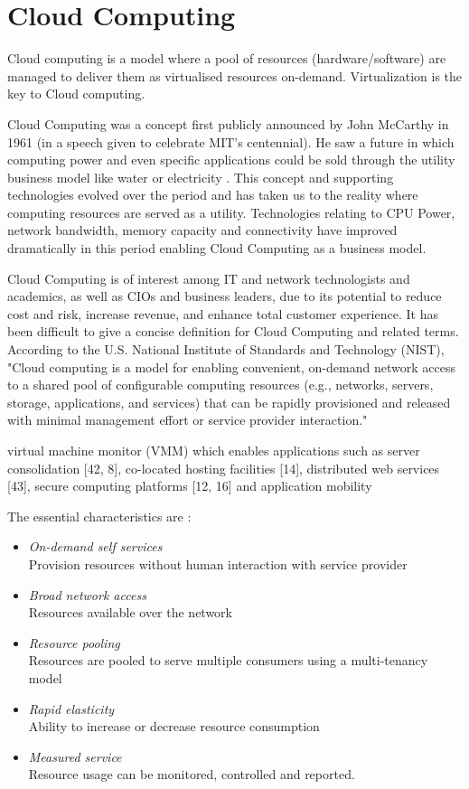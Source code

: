 \documentclass[12pt,a4paper]{report}
\begin{document}
\section{Cloud Computing}

Cloud computing is a model where a pool of resources (hardware/software) are
managed to deliver them as virtualised resources on-demand. Virtualization is the key
to Cloud computing.


Cloud Computing was a concept first publicly announced by John McCarthy in 1961 
(in a speech given to celebrate MIT's centennial). He saw a future in which computing 
power and even specific applications could be sold through the utility 
business model like water or electricity \cite{garfinkel1999architects}.
This concept and  supporting technologies evolved over the period and has taken us 
to the reality where computing resources are served as a utility. 
Technologies relating to CPU Power, network bandwidth, memory capacity 
and connectivity have improved dramatically in this period enabling Cloud Computing as 
a business model.

Cloud Computing is of interest among IT and network technologists
and academics, as well as CIOs and business leaders, due to its potential to 
reduce cost and risk, increase revenue, and enhance total customer experience.\cite{weinman2011future}
It has been difficult to give a concise definition for Cloud Computing 
and related terms. According to the U.S. National Institute of Standards 
and Technology (NIST), \cite{mell2009nist}  "Cloud computing is a model for enabling convenient,
on-demand network access to a shared pool of configurable computing resources
(e.g., networks, servers, storage, applications, and services) that can 
be rapidly provisioned and released with minimal management 
effort or service provider interaction." 

virtual machine monitor (VMM) which enables applications such as server consolidation [42, 8], co-located hosting
facilities [14], distributed web services [43], secure computing platforms [12, 16] and application
mobility

The essential characteristics are \cite{mell2009nist} :

\begin{itemize}
  \item \emph{On-demand self services} \\ Provision resources without human
     interaction with service provider
  \item \emph{Broad network access} \\Resources available over the network
  \item \emph{Resource pooling} \\ Resources are pooled to serve multiple 
        consumers using a multi-tenancy model
  \item \emph{Rapid elasticity} \\Ability to increase or decrease resource consumption
  \item \emph{Measured service} \\Resource usage can be monitored, controlled and reported.
\end{itemize}
\end{document}
